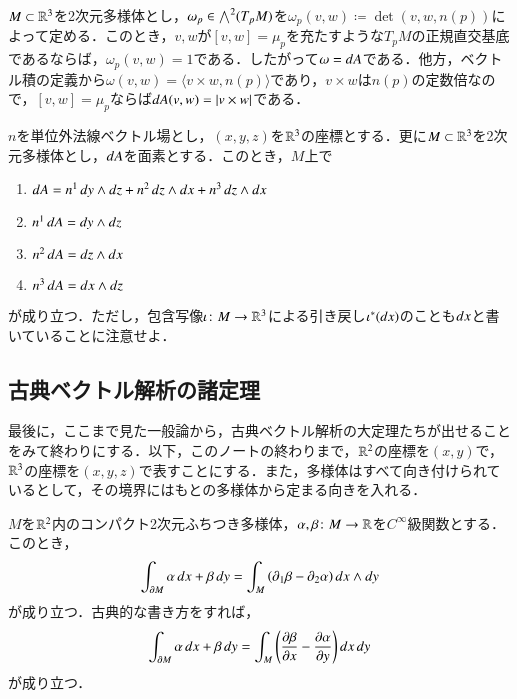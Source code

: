\begin{exm}
$M \subset \mathbb{R}^3$を2次元多様体とし，$\omega_p \in \bigwedge^2(T_pM)$を$\omega_p(v,w) \coloneqq \det(v,w,n(p))$によって定める．このとき，$v,w$が$[v,w] = \mu_p$を充たすような$T_pM$の正規直交基底であるならば，$\omega_p(v,w) = 1$である．したがって$\omega = \mathop{}\!d A$である．他方，ベクトル積の定義から$\omega(v,w) = \langle v \times w, n(p) \rangle$であり，$v \times w$は$n(p)$の定数倍なので，$[v,w] = \mu_p$ならば$\mathop{}\!d A(v,w) = |v \times w|$である．
\end{exm}

\begin{thm}
$n$を単位外法線ベクトル場とし，$(x,y,z)$を$\mathbb{R}^3$の座標とする．更に$M \subset \mathbb{R}^3$を2次元多様体とし，$\mathop{}\!d A$を面素とする．このとき，$M$上で
\begin{enumerate}
\item $\mathop{}\!d A = n^1 \mathop{}\!d y\wedge \mathop{}\!d z + n^2 \mathop{}\!d z \wedge \mathop{}\!d x + n^3 \mathop{}\!d z \wedge \mathop{}\!d x$
\item $n^1 \mathop{}\!d A = \mathop{}\!d y \wedge \mathop{}\!d z$
\item $n^2 \mathop{}\!d A = \mathop{}\!d z \wedge \mathop{}\!d x$
\item $n^3 \mathop{}\!d A = \mathop{}\!d x \wedge \mathop{}\!d z$
\end{enumerate}が成り立つ．ただし，包含写像$\iota \colon M \to \mathbb{R}^3$による引き戻し$\iota^*(\mathop{}\!d x)$のことも$\mathop{}\!d x$と書いていることに注意せよ．
\end{thm}

\subsection{古典ベクトル解析の諸定理}

最後に，ここまで見た一般論から，古典ベクトル解析の大定理たちが出せることをみて終わりにする．以下，このノートの終わりまで，$\mathbb{R}^2$の座標を$(x,y)$で，$\mathbb{R}^3$の座標を$(x,y,z)$で表すことにする．また，多様体はすべて向き付けられているとして，その境界にはもとの多様体から定まる向きを入れる．

\begin{thm}[Green]
$M$を$\mathbb{R}^2$内のコンパクト2次元ふちつき多様体，$\alpha, \beta \colon M \to \mathbb{R}$を$C^\infty$級関数とする．このとき，
\begin{equation}
\int_{\partial M} \alpha \mathop{}\!d x + \beta \mathop{}\!d y = \int_M \left( \partial_1 \beta - \partial_2 \alpha \right) \mathop{}\!d x \wedge \mathop{}\!d y
\end{equation}が成り立つ．古典的な書き方をすれば，
\begin{equation}
\int_{\partial M} \alpha \mathop{}\!d x + \beta \mathop{}\!d y = \int_M \left( \frac{\partial \beta}{\partial x} - \frac{\partial \alpha}{\partial y} \right) \mathop{}\!d x \mathop{}\!d y
\end{equation}が成り立つ．
\end{thm}

